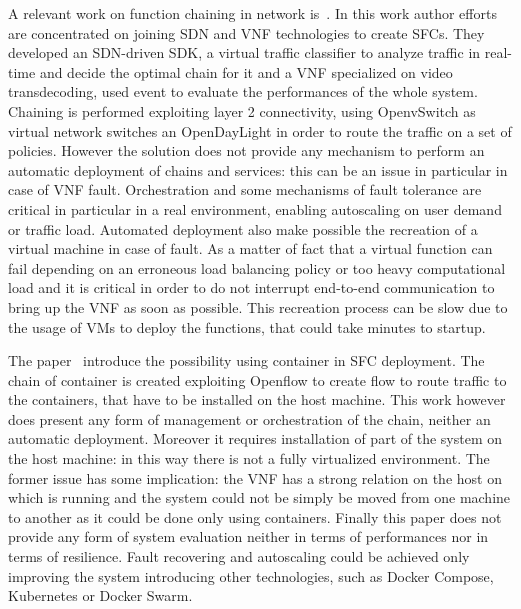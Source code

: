 A relevant work on function chaining in network is~\cite{trajkovska2017sdn}. In
this work author efforts are concentrated on joining SDN and VNF technologies to
create SFCs. They developed an SDN-driven SDK, a virtual traffic classifier to
analyze traffic in real-time and decide the optimal chain for it and a VNF
specialized on video transdecoding, used event to evaluate the performances of
the whole system. Chaining is performed exploiting layer 2 connectivity, using
OpenvSwitch as virtual network switches an OpenDayLight in order to route the
traffic on a set of policies. However the solution does not provide any
mechanism to perform an automatic deployment of chains and services: this can be
an issue in particular in case of VNF fault. Orchestration and some mechanisms
of fault tolerance are critical in particular in a real environment, enabling
autoscaling on user demand or traffic load. Automated deployment also make
possible the recreation of a virtual machine in case of fault. As a matter of
fact that a virtual function can fail depending on an erroneous load balancing
policy or too heavy computational load and it is critical in order to do not
interrupt end-to-end communication to bring up the VNF as soon as possible. This
recreation process can be slow due to the usage of VMs to deploy the functions,
that could take minutes to startup.

The paper~\cite{kriti2017dnfc} introduce the possibility using container in SFC
deployment. The chain of container is created exploiting Openflow to create flow
to route traffic to the containers, that have to be installed on the host
machine. This work however does present any form of management or orchestration
of the chain, neither an automatic deployment. Moreover it requires installation
of part of the system on the host machine: in this way there is not a fully
virtualized environment. The former issue has some implication: the VNF has a
strong relation on the host on which is running and the system could not be
simply be moved from one machine to another as it could be done only using
containers. Finally this paper does not provide any form of system evaluation
neither in terms of performances nor in terms of resilience. Fault recovering
and autoscaling could be achieved only improving the system introducing other
technologies, such as Docker Compose, Kubernetes or Docker Swarm.







